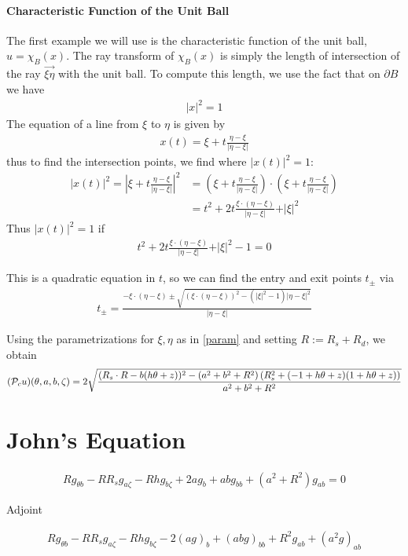 \documentclass[12pt]{article}
\begin{document}
\paragraph{Characteristic Function of the Unit Ball}
The first example we will use is the characteristic function of the unit ball, $u = \chi_{B}(x)$.  The ray transform of $\chi_B(x)$ is simply the length of intersection of the ray $\overrightarrow{\xi\eta}$ with the unit ball.  To compute this length, we use the fact that on $\partial B$ we have
\begin{align*}
\vert x\vert ^2 = 1
\end{align*}  The equation of a line from $\xi$ to $\eta$ is given by 
\begin{align*}
x(t) = \xi+t\frac{\eta-\xi}{\vert \eta-\xi\vert}
\end{align*}thus to find the intersection points, we find where $\vert x(t)\vert^2 = 1$: 
\begin{align*}
\vert x(t)\vert ^2 = \left\vert \xi+t\frac{\eta-\xi}{\vert \eta-\xi\vert}\right\vert ^2  &= \left(\xi+t\frac{\eta-\xi}{\vert \eta-\xi\vert}\right)\cdot \left(\xi+t\frac{\eta-\xi}{\vert \eta-\xi\vert}\right)\\
& = t^2 + 2t\frac{\xi\cdot(\eta-\xi)}{\vert \eta -\xi\vert} + \vert \xi\vert^2
\end{align*}Thus $\vert x(t)\vert^2 = 1$ if 
\begin{align*}
t^2 + 2t\frac{\xi\cdot(\eta-\xi)}{\vert \eta -\xi\vert} + \vert \xi\vert^2-1=0
\end{align*}

This is a quadratic equation in $t$, so we can find the entry and exit points $t_{\pm}$ via 
\begin{align*}
t_{\pm} = \frac{-\xi\cdot(\eta-\xi)\pm\sqrt{(\xi\cdot (\eta-\xi))^2-(\vert\xi\vert^2-1)\vert\eta-\xi\vert^2}}{\vert\eta-\xi\vert}
\end{align*}

Using the parametrizations for $\xi,\eta$ as in \eqref{param} and setting $R:=R_s+R_d$, we obtain 
\begin{align*}
(\P_cu)(\theta,a,b,\zeta) = 2\sqrt{\frac{(R_s \cdot R-b (h \theta+z))^2-\left(a^2+b^2+R^2\right) \left(R_s^2+(-1+h \theta+z) (1+h \theta+z)\right)}{a^2+b^2+R^2}}
\end{align*}


\section{John's Equation}



\begin{align*}
Rg_{\theta b} - RR_s g_{a\zeta} - Rhg_{b\zeta} + 2ag_b + abg_{bb} + (a^2+R^2)g_{ab} = 0
\end{align*}

Adjoint 

\begin{align*}
Rg_{\theta b} - RR_s g_{a\zeta} - Rhg_{b\zeta} - 2(ag)_b + (abg)_{bb} + R^2 g_{ab} + (a^2 g)_{ab} 
\end{align*}
\end{document}
